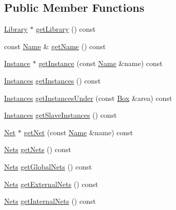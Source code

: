 \subsection*{Public Member Functions}
\begin{DoxyCompactItemize}
\item 
\hyperlink{classHurricane_1_1Library}{Library} $\ast$ \hyperlink{classHurricane_1_1Cell_adb4b5b4e0465952afce8c18b85bceb85}{get\-Library} () const 
\item 
const \hyperlink{classHurricane_1_1Name}{Name} \& \hyperlink{classHurricane_1_1Cell_a6c2825a458c30a6ee06b73e1e9505662}{get\-Name} () const 
\item 
\hyperlink{classHurricane_1_1Instance}{Instance} $\ast$ \hyperlink{classHurricane_1_1Cell_a96e72376313aae0d17b2cf352d1c98df}{get\-Instance} (const \hyperlink{classHurricane_1_1Name}{Name} \&name) const 
\item 
\hyperlink{namespaceHurricane_ac9436b03a2926f34ad6863deae2baadc}{Instances} \hyperlink{classHurricane_1_1Cell_a2c4426819fbbf12174c1a48d81b51d34}{get\-Instances} () const 
\item 
\hyperlink{namespaceHurricane_ac9436b03a2926f34ad6863deae2baadc}{Instances} \hyperlink{classHurricane_1_1Cell_aacab8c59d937f9236483f6d398103edb}{get\-Instances\-Under} (const \hyperlink{classHurricane_1_1Box}{Box} \&area) const 
\item 
\hyperlink{namespaceHurricane_ac9436b03a2926f34ad6863deae2baadc}{Instances} \hyperlink{classHurricane_1_1Cell_aa1d0da0dfa495a61d23ff959b8cc7ae3}{get\-Slave\-Instances} () const 
\item 
\hyperlink{classHurricane_1_1Net}{Net} $\ast$ \hyperlink{classHurricane_1_1Cell_a281d28f07b4d2c5ae4364335b77446b5}{get\-Net} (const \hyperlink{classHurricane_1_1Name}{Name} \&name) const 
\item 
\hyperlink{namespaceHurricane_a3404a8b17130a1824f4a281704b04df7}{Nets} \hyperlink{classHurricane_1_1Cell_a9b5b689312a65ce38e9259779f3c2978}{get\-Nets} () const 
\item 
\hyperlink{namespaceHurricane_a3404a8b17130a1824f4a281704b04df7}{Nets} \hyperlink{classHurricane_1_1Cell_a2b82bee91b06cb5eb23001431a42f7cb}{get\-Global\-Nets} () const 
\item 
\hyperlink{namespaceHurricane_a3404a8b17130a1824f4a281704b04df7}{Nets} \hyperlink{classHurricane_1_1Cell_aff0cf823fecca38a42eacab70b63592b}{get\-External\-Nets} () const 
\item 
\hyperlink{namespaceHurricane_a3404a8b17130a1824f4a281704b04df7}{Nets} \hyperlink{classHurricane_1_1Cell_a4393adb4276bf77885f0f3f45c94ae31}{get\-Internal\-Nets} () const 

\end{DoxyCompactItemize}
